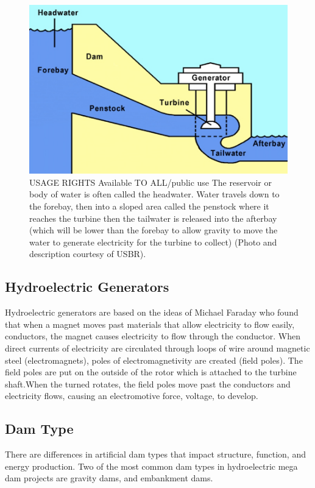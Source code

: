 \documentclass{book}\usepackage{knitr}
\begin{document}
\begin{figure}
\includegraphics[width=\textwidth]{images/diagram.png}
\caption{USAGE RIGHTS Available TO ALL/public use The reservoir or body of water is often called the headwater. Water travels down to the forebay, then into a sloped area called the penstock where it reaches the turbine then the tailwater is released into the afterbay (which will be lower than the forebay to allow gravity to move the water to generate electricity for the turbine to collect) (Photo and description courtesy of USBR).}
\label{fig:USBR}
\end{figure}


\subsection{Hydroelectric Generators}
  Hydroelectric generators are based on the ideas of Michael Faraday who found that when a magnet moves past materials that allow electricity to flow easily, conductors, the magnet causes electricity to flow through the conductor. When direct currents of electricity are circulated through loops of wire around magnetic steel (electromagnets), poles of electromagnetivity are created (field poles). The field poles are put on the outside of the rotor which is attached to the turbine shaft.When the turned rotates, the field poles move past the conductors and electricity flows, causing an electromotive force, voltage, to develop. 
\subsection{Dam Type}
There are differences in artificial dam types that impact structure, function, and energy production. Two of the most common dam types in hydroelectric mega dam projects are gravity dams, and embankment dams. 
\end{document}
